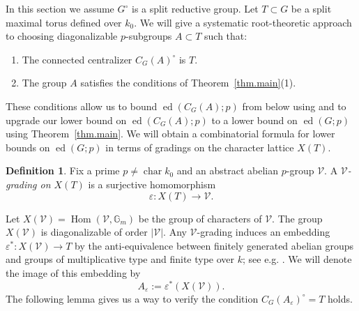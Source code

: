 \documentclass[12pt]{amsart}
\numberwithin{equation}{section}
\theoremstyle{definition}
\newtheorem{definition}[theorem]{Definition}
\newcommand{\cV}{\mathcal{V}}
\newcommand{\Gm}{\mathbb{G}_m}
\newcommand{\Hom}{\operatorname{Hom}}
\newcommand{\ed}{\operatorname{ed}}
\newcommand{\Char}{\operatorname{char}}
\newcommand{\eps}{\varepsilon}
\begin{document}
In this section we assume $G^{\circ}$ is a split reductive group. Let $T\subset G$ be a split maximal torus defined over $k_0$. We will give a systematic root-theoretic approach to choosing diagonalizable $p$-subgroups $A\subset T$ such that:
\begin{enumerate}
    \item The connected centralizer $C_G(A)^{\circ}$ is $T$.
    \item The group $A$ satisfies the conditions of Theorem~\ref{thm.main}(1).
\end{enumerate} 
These conditions allow us to bound $\ed(C_G(A);p)$ from below using \cite{lotscher2013essential2} and to upgrade our lower bound on $\ed(C_G(A);p)$ to a lower bound on $\ed(G;p)$ using Theorem~\ref{thm.main}. We will obtain a combinatorial formula for lower bounds on $\ed(G;p)$ in terms of gradings on the character lattice $X(T)$.

\begin{definition}
   Fix a prime $p\neq \Char k_0$ and an abstract abelian $p$-group $\cV$. A \emph{$\cV$-grading on $X(T)$} is a surjective homomorphism $$\eps: X(T)\to \cV.$$
\end{definition}
Let $X(\cV) = \Hom(\cV,\Gm)$ be the group of characters of $\cV$. The group $X(\cV)$ is diagonalizable of order $|\cV|$.  Any $\cV$-grading induces an embedding $\eps^* : X(\cV) \to T$ by the anti-equivalence between finitely generated abelian groups and groups of multiplicative type and finite type over $k$; see e.g. \cite[Corollary 8.3]{borel1965groupes}. We will denote the image of this embedding by \begin{equation}\label{e.def_Aeps}
A_\eps:= \eps^*(X(\cV)).
\end{equation}
The following lemma gives us a way to verify the condition $C_G(A_\eps)^{\circ}=T$ holds. 
\end{document}
